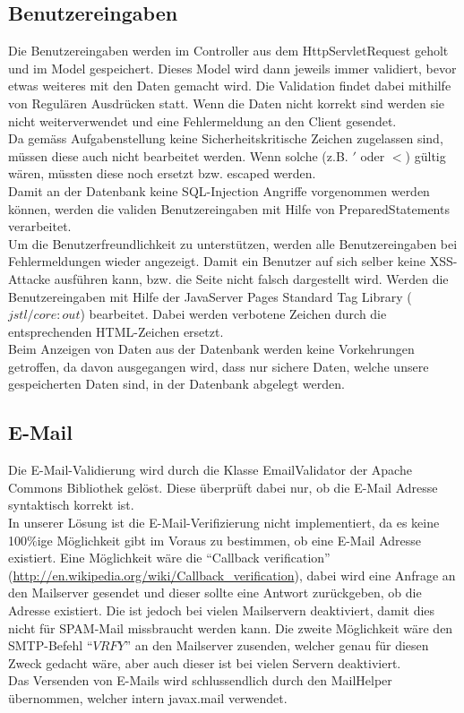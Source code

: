 \documentclass[12pt]{scrartcl}
\begin{document}
\subsection{Benutzereingaben}
Die Benutzereingaben werden im Controller aus dem HttpServletRequest geholt und im Model gespeichert. Dieses Model wird dann jeweils immer validiert, bevor etwas weiteres mit den Daten gemacht wird. Die Validation findet dabei mithilfe von Regulären Ausdrücken statt. Wenn die Daten nicht korrekt sind werden sie nicht weiterverwendet und eine Fehlermeldung an den Client gesendet.\\
Da gemäss Aufgabenstellung keine Sicherheitskritische Zeichen zugelassen sind, müssen diese auch nicht bearbeitet werden. Wenn solche (z.B. $'$ oder $<$) gültig wären, müssten diese noch ersetzt bzw. escaped werden.\\
Damit an der Datenbank keine SQL-Injection Angriffe vorgenommen werden können, werden die validen Benutzereingaben mit Hilfe von PreparedStatements verarbeitet.\\
Um die Benutzerfreundlichkeit zu unterstützen, werden alle Benutzereingaben bei Fehlermeldungen wieder angezeigt. Damit ein Benutzer auf sich selber keine XSS-Attacke ausführen kann, bzw. die Seite nicht falsch dargestellt wird. Werden die Benutzereingaben mit Hilfe der JavaServer Pages Standard Tag Library ($jstl/core:out$) bearbeitet. Dabei werden verbotene Zeichen durch die entsprechenden HTML-Zeichen ersetzt.\\
Beim Anzeigen von Daten aus der Datenbank werden keine Vorkehrungen getroffen, da davon ausgegangen wird, dass nur sichere Daten, welche unsere gespeicherten Daten sind, in der Datenbank abgelegt werden.

\subsection{E-Mail}
Die E-Mail-Validierung wird durch die Klasse EmailValidator der Apache Commons Bibliothek gelöst. Diese überprüft dabei nur, ob die E-Mail Adresse syntaktisch korrekt ist.\\
In unserer Lösung ist die E-Mail-Verifizierung nicht implementiert, da es keine 100\%ige Möglichkeit gibt im Voraus zu bestimmen, ob eine E-Mail Adresse existiert. Eine Möglichkeit wäre die "`Callback verification"' (\url{http://en.wikipedia.org/wiki/Callback_verification}), dabei wird eine Anfrage an den Mailserver gesendet und dieser sollte eine Antwort zurückgeben, ob die Adresse existiert. Die ist jedoch bei vielen Mailservern deaktiviert, damit dies nicht für SPAM-Mail missbraucht werden kann. Die zweite Möglichkeit wäre den SMTP-Befehl "`$VRFY$"' an den Mailserver zusenden, welcher genau für diesen Zweck gedacht wäre, aber auch dieser ist bei vielen Servern deaktiviert.\\
Das Versenden von E-Mails wird schlussendlich durch den MailHelper übernommen, welcher intern javax.mail verwendet.
\end{document}
